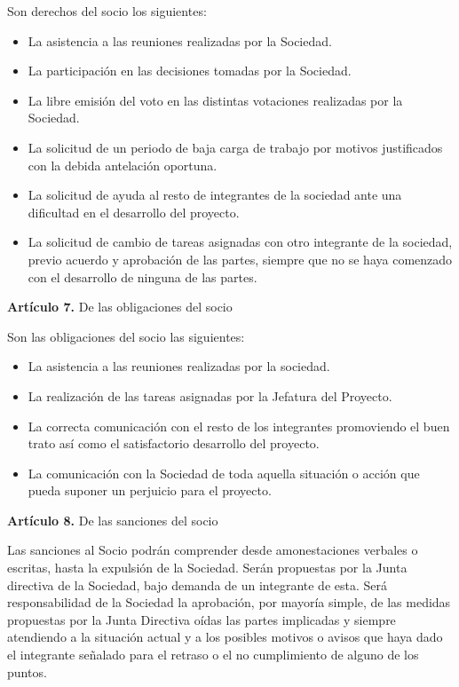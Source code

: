 Son derechos del socio los siguientes:

\begin{itemize}
    \item La asistencia a las reuniones realizadas por la Sociedad.
    \item La participación en las decisiones tomadas por la Sociedad.
    \item La libre emisión del voto en las distintas votaciones realizadas por la Sociedad.
    \item La solicitud de un periodo de baja carga de trabajo por motivos justificados con la debida antelación oportuna.
    \item La solicitud de ayuda al resto de integrantes de la sociedad ante una dificultad en el desarrollo del proyecto.
    \item La solicitud de cambio de tareas asignadas con otro integrante de la sociedad, previo acuerdo y aprobación de las partes, siempre que no se haya comenzado con el desarrollo de ninguna de las partes.
    
\end{itemize}

\textbf{Artículo 7.} De las obligaciones del socio

Son las obligaciones del socio las siguientes:

\begin{itemize}
    \item La asistencia a las reuniones realizadas por la sociedad.
    \item La realización de las tareas asignadas por la Jefatura del Proyecto.
    \item La correcta comunicación con el resto de los integrantes promoviendo el buen trato así como el satisfactorio desarrollo del proyecto.
    \item La comunicación con la Sociedad de toda aquella situación o acción que pueda suponer un perjuicio para el proyecto.
\end{itemize}

\textbf{Artículo 8.} De las sanciones del socio

Las sanciones al Socio podrán comprender desde amonestaciones verbales o escritas, hasta la expulsión de la Sociedad. Serán propuestas por la Junta directiva de la Sociedad, bajo demanda de un integrante de esta.
Será responsabilidad de la Sociedad la aprobación, por mayoría simple, de las medidas propuestas por la Junta Directiva oídas las partes implicadas y siempre atendiendo a la situación actual y a los posibles motivos o avisos que haya dado el integrante señalado para el retraso o el no cumplimiento de alguno de los puntos.

